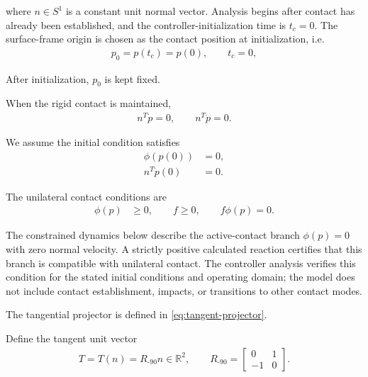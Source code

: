 \documentclass[10pt,journal,letterpaper]{IEEEtran}
\begin{document}
where $n\in S^{1}$ is a constant unit normal vector. Analysis begins after contact has already been established, and the controller-initialization time is $t_c=0$. The surface-frame origin is chosen as the contact position at initialization, i.e.
\begin{align*}
p_{0}=p(t_{c})=p(0), \qquad t_c=0,
\end{align*}

After initialization, $p_{0}$ is kept fixed.

When the rigid contact is maintained, 
\begin{equation}\label{eq:contact-constraints}
\begin{aligned}
n^T\dot p=0,
\qquad
n^T\ddot p=0.
\end{aligned}
\end{equation}

We assume the initial condition satisfies 
\begin{equation}\label{eq:initial-contact}
\begin{aligned}
\phi(p(0)) & = 0, \\
n^{T}\dot p(0) & = 0.
\end{aligned}
\end{equation}

The unilateral contact conditions are
\begin{align*}
\phi(p)&\geq0,\qquad f\geq0,\qquad f\phi(p)=0.
\end{align*}

The constrained dynamics below describe the active-contact branch $\phi(p)=0$ with zero normal velocity. A strictly positive calculated reaction certifies that this branch is compatible with unilateral contact. The controller analysis verifies this condition for the stated initial conditions and operating domain; the model does not include contact establishment, impacts, or transitions to other contact modes.

The tangential projector is defined in \eqref{eq:tangent-projector}.

Define the tangent unit vector
\begin{equation}\label{eq:tangent-definition}
\begin{aligned}
T=T(n)=R_{\text{-90}}n\in\mathbb R^2,
\qquad
R_{\text{-90}}=
\begin{bmatrix}
0&1\\
-1&0
\end{bmatrix}.
\end{aligned}
\end{equation}
\end{document}
